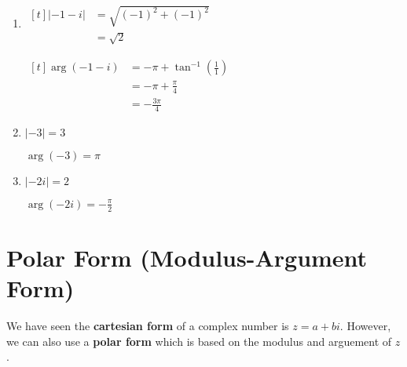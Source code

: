 \documentclass[11pt,a4paper]{book}
\begin{document}
\begin{example}
\begin{enumerate}[label=(\alph*)]
\item

\begin{minipage}[t]{0.3\textwidth}
$
\begin{aligned}[t]
\left|-1-i\right| & =\sqrt{\left(-1\right)^{2}+\left(-1\right)^{2}}\\
 & =\sqrt{2}
\end{aligned}
$

\end{minipage}
\begin{minipage}[t]{0.3\textwidth}

$
\begin{aligned}[t]
\arg\left(-1-i\right) & =-\pi+\tan^{-1}\left(\frac{1}{1}\right)\\
 & =-\pi+\frac{\pi}{4}\\
 & =-\frac{3\pi}{4}
\end{aligned}
$

\end{minipage}

\item

\begin{minipage}[t]{0.3\textwidth}
$\left|-3\right|=3$


\end{minipage}
\begin{minipage}[t]{0.3\textwidth}
$\arg\left(-3\right)=\pi$

\end{minipage}

\item

\begin{minipage}[t]{0.3\textwidth}
$\left|-2i\right|=2$

\end{minipage}
\begin{minipage}[t]{0.3\textwidth}
$\arg\left(-2i\right)=-\frac{\pi}{2}$
\end{minipage}

\end{enumerate}

\end{example}

\section{Polar Form (Modulus-Argument Form)}

We have seen the \textbf{cartesian form }of a complex number is $z=a+bi$.
However, we can also use a \textbf{polar form }which is based on the
modulus and arguement of $z$.
\end{document}
